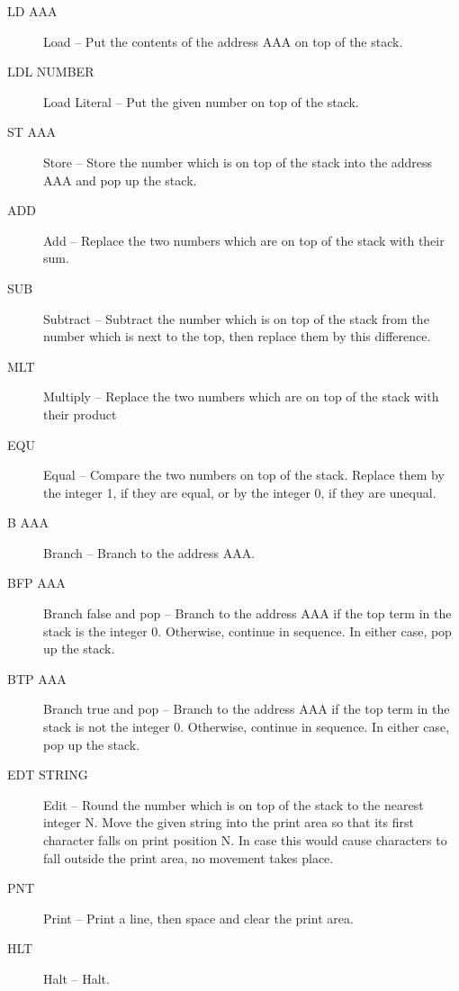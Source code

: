 \documentclass[twocolumn]{article}
\begin{document}
\begin{description}
\item[LD AAA]      Load -- Put the contents of the address AAA on top of the stack.

\item[LDL NUMBER]  Load Literal -- Put the given number on top of the stack.

\item[ST AAA]      Store -- Store the number which is on top of the stack into the address AAA and pop up the stack.

\item[ADD]         Add -- Replace the two numbers which are on top of the stack with their sum.

\item[SUB]         Subtract -- Subtract the number which is on top of the stack from
the number which is next to the top, then replace them by this difference.

\item[MLT]         Multiply -- Replace the two numbers which are on top of the stack
with their product

\item[EQU]         Equal -- Compare the two numbers on top of the stack. Replace them
by the integer 1, if they are equal, or by the integer 0, if they are unequal.

\item[B AAA]       Branch -- Branch to the address AAA.

\item[BFP AAA]     Branch false and pop -- Branch to the address AAA if the top term
in the stack is the integer 0. Otherwise, continue in sequence. In either case,
pop up the stack.

\item[BTP AAA]     Branch true and pop -- Branch to the address AAA if the top term
in the stack is not the integer 0. Otherwise, continue in sequence. In either
case, pop up the stack.

\item[EDT STRING]  Edit -- Round the number which is on top of the stack to the nearest
integer N. Move the given string into the print area so that its first character
falls on print position N. In case this would cause characters to fall outside
the print area, no movement takes place.

\item[PNT]        Print -- Print a line, then space and clear the print area.

\item[HLT]        Halt -- Halt.
\end{description}
\end{document}
